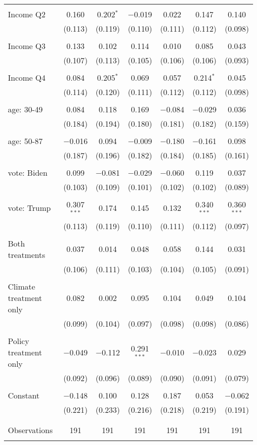 \begin{tabular}{@{\extracolsep{5pt}}lcccccc}
  & & & & & & \\ 
 Income Q2 & 0.160 & 0.202$^{*}$ & $-$0.019 & 0.022 & 0.147 & 0.140 \\ 
  & (0.113) & (0.119) & (0.110) & (0.111) & (0.112) & (0.098) \\ 
  & & & & & & \\ 
 Income Q3 & 0.133 & 0.102 & 0.114 & 0.010 & 0.085 & 0.043 \\ 
  & (0.107) & (0.113) & (0.105) & (0.106) & (0.106) & (0.093) \\ 
  & & & & & & \\ 
 Income Q4 & 0.084 & 0.205$^{*}$ & 0.069 & 0.057 & 0.214$^{*}$ & 0.045 \\ 
  & (0.114) & (0.120) & (0.111) & (0.112) & (0.112) & (0.098) \\ 
  & & & & & & \\ 
 age: 30-49 & 0.084 & 0.118 & 0.169 & $-$0.084 & $-$0.029 & 0.036 \\ 
  & (0.184) & (0.194) & (0.180) & (0.181) & (0.182) & (0.159) \\ 
  & & & & & & \\ 
 age: 50-87 & $-$0.016 & 0.094 & $-$0.009 & $-$0.180 & $-$0.161 & 0.098 \\ 
  & (0.187) & (0.196) & (0.182) & (0.184) & (0.185) & (0.161) \\ 
  & & & & & & \\ 
 vote: Biden & 0.099 & $-$0.081 & $-$0.029 & $-$0.060 & 0.119 & 0.037 \\ 
  & (0.103) & (0.109) & (0.101) & (0.102) & (0.102) & (0.089) \\ 
  & & & & & & \\ 
 vote: Trump & 0.307$^{***}$ & 0.174 & 0.145 & 0.132 & 0.340$^{***}$ & 0.360$^{***}$ \\ 
  & (0.113) & (0.119) & (0.110) & (0.111) & (0.112) & (0.097) \\ 
  & & & & & & \\ 
 Both treatments & 0.037 & 0.014 & 0.048 & 0.058 & 0.144 & 0.031 \\ 
  & (0.106) & (0.111) & (0.103) & (0.104) & (0.105) & (0.091) \\ 
  & & & & & & \\ 
 Climate treatment only & 0.082 & 0.002 & 0.095 & 0.104 & 0.049 & 0.104 \\ 
  & (0.099) & (0.104) & (0.097) & (0.098) & (0.098) & (0.086) \\ 
  & & & & & & \\ 
 Policy treatment only & $-$0.049 & $-$0.112 & 0.291$^{***}$ & $-$0.010 & $-$0.023 & 0.029 \\ 
  & (0.092) & (0.096) & (0.089) & (0.090) & (0.091) & (0.079) \\ 
  & & & & & & \\ 
 Constant & $-$0.148 & 0.100 & 0.128 & 0.187 & 0.053 & $-$0.062 \\ 
  & (0.221) & (0.233) & (0.216) & (0.218) & (0.219) & (0.191) \\ 
  & & & & & & \\ 
\hline \\[-1.8ex] 

Observations & 191 & 191 & 191 & 191 & 191 & 191 \\ 
\hline 
\hline \\[-1.8ex] 
\end{tabular} 